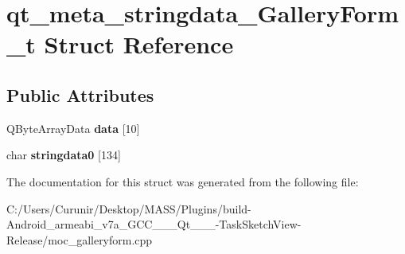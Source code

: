 \hypertarget{structqt__meta__stringdata___gallery_form__t}{}\section{qt\+\_\+meta\+\_\+stringdata\+\_\+\+Gallery\+Form\+\_\+t Struct Reference}
\label{structqt__meta__stringdata___gallery_form__t}
\subsection*{Public Attributes}
\begin{DoxyCompactItemize}
\item 
\mbox{\label{structqt__meta__stringdata___gallery_form__t_abeb7d89e67120407601d93347f648873}} 
Q\+Byte\+Array\+Data {\bfseries data} \mbox{[}10\mbox{]}
\item 
\mbox{\label{structqt__meta__stringdata___gallery_form__t_a395abaacd985ccdc8f873aad90e44514}} 
char {\bfseries stringdata0} \mbox{[}134\mbox{]}
\end{DoxyCompactItemize}


The documentation for this struct was generated from the following file\+:\begin{DoxyCompactItemize}
\item 
C\+:/\+Users/\+Curunir/\+Desktop/\+M\+A\+S\+S/\+Plugins/build-\/\+Android\+\_\+armeabi\+\_\+v7a\+\_\+\+G\+C\+C\+\_\+\_\+\_\+\+Qt\+\_\+\_\+\_-\/\+Task\+Sketch\+View-\/\+Release/moc\+\_\+galleryform.\+cpp\end{DoxyCompactItemize}

